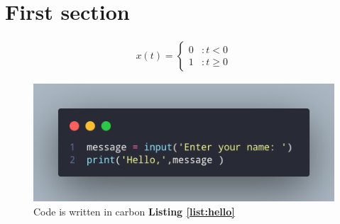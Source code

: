 \section{First section}

\begin{align}
  x(t) = \begin{cases}
   0 &: t<0\\
   1 &: t\geq 0\end{cases}
 \end{align}
 
 \begin{figure}[H]
  \includegraphics[width = \textwidth]{images/dd.png}
  \caption{Code is written in carbon \textbf{Listing \ref{list:hello}}}
  \label{fig:carbon}
\end{figure}